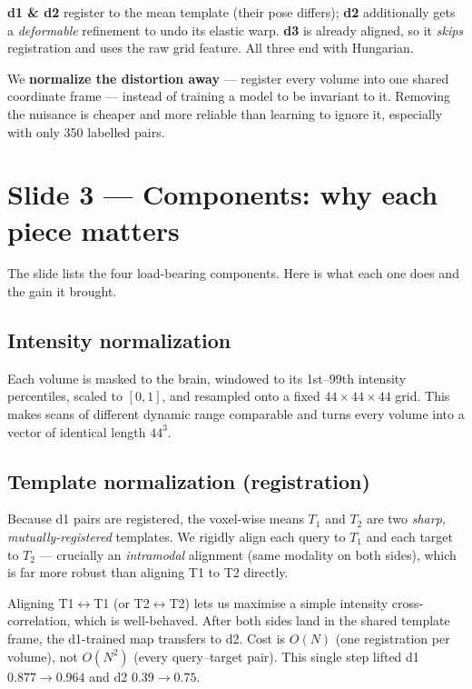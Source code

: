 \documentclass[12pt,a4paper]{article}   %
\begin{document}
\begin{system}
\textbf{d1 \& d2} register to the mean template (their pose differs); \textbf{d2} additionally gets
a \emph{deformable} refinement to undo its elastic warp. \textbf{d3} is already aligned, so it
\emph{skips} registration and uses the raw grid feature. All three end with Hungarian.
\end{system}

\begin{mentalmodel}
We \textbf{normalize the distortion away} --- register every volume into one shared coordinate
frame --- instead of training a model to be invariant to it. Removing the nuisance is cheaper and
more reliable than learning to ignore it, especially with only 350 labelled pairs.
\end{mentalmodel}

\section{Slide 3 --- Components: why each piece matters}
The slide lists the four load-bearing components. Here is what each one does and the gain it brought.

\subsection{Intensity normalization}
Each volume is masked to the brain, windowed to its 1st--99th intensity percentiles, scaled to
$[0,1]$, and resampled onto a fixed $44\times44\times44$ grid. This makes scans of different dynamic
range comparable and turns every volume into a vector of identical length $44^3$.

\subsection{Template normalization (registration)}
Because d1 pairs are registered, the voxel-wise means $T_1$ and $T_2$ are two \emph{sharp,
mutually-registered} templates. We rigidly align each query to $T_1$ and each target to $T_2$ ---
crucially an \emph{intramodal} alignment (same modality on both sides), which is far more robust
than aligning T1 to T2 directly.

\begin{mathidea}
Aligning T1$\leftrightarrow$T1 (or T2$\leftrightarrow$T2) lets us maximise a simple intensity
cross-correlation, which is well-behaved. After both sides land in the shared template frame, the
d1-trained map transfers to d2. Cost is $O(N)$ (one registration per volume), not $O(N^2)$ (every
query--target pair). This single step lifted d1 $0.877\to0.964$ and d2 $0.39\to0.75$.
\end{mathidea}
\end{document}
